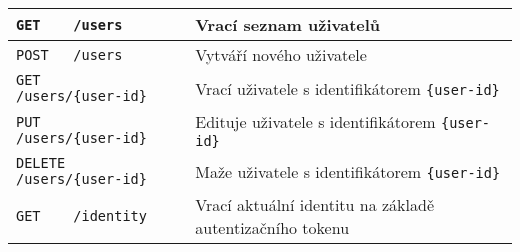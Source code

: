 \begin{sidewaystable}[ht]
\begin{tabular}{|l|l|}
\verb|GET    /users|                                     & Vrací seznam uživatelů \\ \hline
\verb|POST   /users|                                     & Vytváří nového uživatele \\ \hline
\verb|GET    /users/{user-id}|                           & Vrací uživatele s identifikátorem \verb|{user-id}| \\ \hline
\verb|PUT    /users/{user-id}|                           & Edituje uživatele s identifikátorem \verb|{user-id}| \\ \hline
\verb|DELETE /users/{user-id}|                           & Maže uživatele s identifikátorem \verb|{user-id}| \\ \hline
\verb|GET    /identity|                                  & Vrací aktuální identitu na základě autentizačního tokenu \\ \hline
\end{tabular}
\end{sidewaystable}

